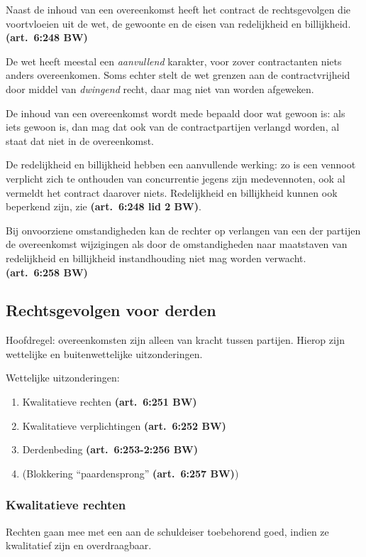 \documentclass[a4paper]{article}
\newcommand{\art}[1]{\textbf{(art.~#1 BW)}\xspace}
\begin{document}
Naast de inhoud van een overeenkomst heeft het contract de rechtsgevolgen die
voortvloeien uit de wet, de gewoonte en de eisen van redelijkheid en
billijkheid. \art{6:248}

De wet heeft meestal een \emph{aanvullend} karakter, voor zover contractanten
niets anders overeenkomen. Soms echter stelt de wet grenzen aan de
contractvrijheid door middel van \emph{dwingend} recht, daar mag niet van
worden afgeweken.

De inhoud van een overeenkomst wordt mede bepaald door wat gewoon is: als iets
gewoon is, dan mag dat ook van de contractpartijen verlangd worden, al staat
dat niet in de overeenkomst.

De redelijkheid en billijkheid hebben een aanvullende werking: zo is een
vennoot verplicht zich te onthouden van concurrentie jegens zijn medevennoten,
ook al vermeldt het contract daarover niets. Redelijkheid en billijkheid
kunnen ook beperkend zijn, zie \art{6:248 lid 2}.

Bij onvoorziene omstandigheden kan de rechter op verlangen van een der
partijen de overeenkomst wijzigingen als door de omstandigheden naar
maatstaven van redelijkheid en billijkheid instandhouding niet mag worden
verwacht. \art{6:258}

\subsection{Rechtsgevolgen voor derden}

Hoofdregel: overeenkomsten zijn alleen van kracht tussen partijen.
Hierop zijn wettelijke en buitenwettelijke uitzonderingen.

Wettelijke uitzonderingen:
\begin{enumerate}
  \item Kwalitatieve rechten \art{6:251}
  \item Kwalitatieve verplichtingen \art{6:252}
  \item Derdenbeding \art{6:253-2:256}
  \item (Blokkering ``paardensprong'' \art{6:257})
\end{enumerate}

\subsubsection{Kwalitatieve rechten}

Rechten gaan mee met een aan de schuldeiser toebehorend goed, indien ze
kwalitatief zijn en overdraagbaar.
\end{document}
